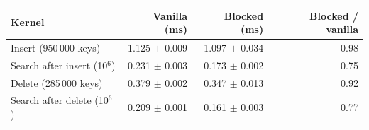 \begin{tabular}{lrrr}
\toprule
Kernel & Vanilla (ms) & Blocked (ms) & Blocked / vanilla \\
\midrule
Insert (950\,000 keys) & 1.125 $\pm$ 0.009 & 1.097 $\pm$ 0.034 & 0.98 \\
Search after insert (10$^6$) & 0.231 $\pm$ 0.003 & 0.173 $\pm$ 0.002 & 0.75 \\
Delete (285\,000 keys) & 0.379 $\pm$ 0.002 & 0.347 $\pm$ 0.013 & 0.92 \\
Search after delete (10$^6$) & 0.209 $\pm$ 0.001 & 0.161 $\pm$ 0.003 & 0.77 \\
\bottomrule
\end{tabular}
